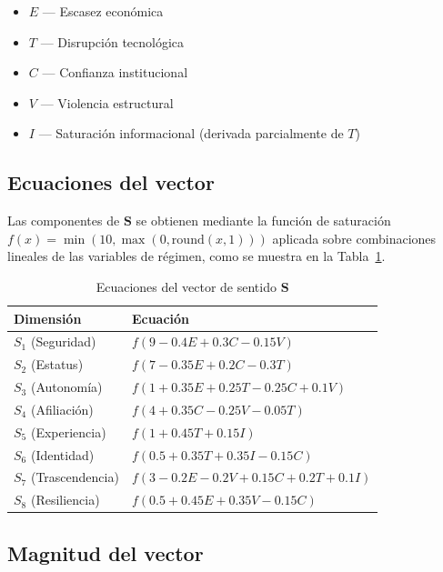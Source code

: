 \documentclass[conference,spanish]{IEEEtran}
\begin{document}
\begin{itemize}
  \item $E$ --- Escasez económica
  \item $T$ --- Disrupción tecnológica
  \item $C$ --- Confianza institucional \cite{latinobarometro2023, monsivais2021}
  \item $V$ --- Violencia estructural \cite{inegi2024homicidios}
  \item $I$ --- Saturación informacional (derivada parcialmente de $T$)
\end{itemize}

\subsection{Ecuaciones del vector}

Las componentes de $\mathbf{S}$ se obtienen mediante la función de saturación $f(x) = \min(10, \max(0, \mathrm{round}(x,1)))$ aplicada sobre combinaciones lineales de las variables de régimen, como se muestra en la Tabla~\ref{tab:ecuaciones}.

\begin{table}[htbp]
\caption{Ecuaciones del vector de sentido $\mathbf{S}$}
\label{tab:ecuaciones}
\begin{tabular}{ll}
\toprule
Dimensión & Ecuación \\
\midrule
$S_1$ (Seguridad) & $f(9 - 0.4E + 0.3C - 0.15V)$ \\
$S_2$ (Estatus) & $f(7 - 0.35E + 0.2C - 0.3T)$ \\
$S_3$ (Autonomía) & $f(1 + 0.35E + 0.25T - 0.25C + 0.1V)$ \\
$S_4$ (Afiliación) & $f(4 + 0.35C - 0.25V - 0.05T)$ \\
$S_5$ (Experiencia) & $f(1 + 0.45T + 0.15I)$ \\
$S_6$ (Identidad) & $f(0.5 + 0.35T + 0.35I - 0.15C)$ \\
$S_7$ (Trascendencia) & $f(3 - 0.2E - 0.2V + 0.15C + 0.2T + 0.1I)$ \\
$S_8$ (Resiliencia) & $f(0.5 + 0.45E + 0.35V - 0.15C)$ \\
\bottomrule
\end{tabular}
\end{table}

\subsection{Magnitud del vector}
\end{document}
